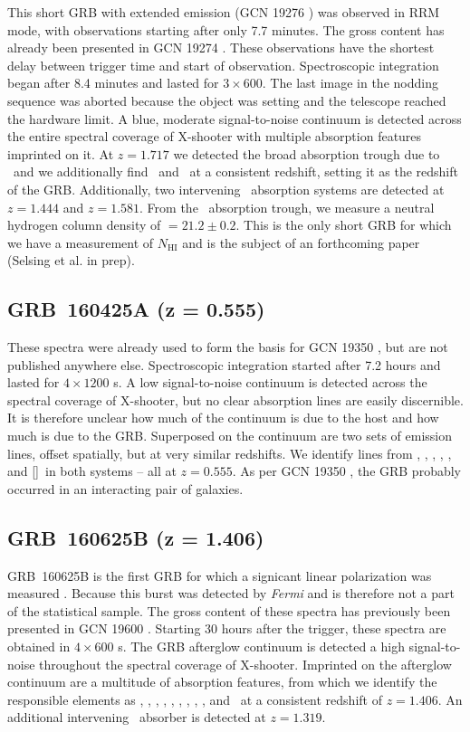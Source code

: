 \documentclass{aa}    %
\begin{document}
This short GRB with extended emission (GCN 19276 \citep{GCN19276}) was observed
in RRM mode, with observations starting after only 7.7 minutes. The gross
content has already been presented in GCN 19274 \citep{GCN19274}. These
observations have the shortest delay between trigger time and start of
observation. Spectroscopic integration began after 8.4 minutes and lasted for $3
\times 600$. The last image in the nodding sequence was aborted because the
object was setting and the telescope reached the hardware limit. A blue,
moderate signal-to-noise continuum is detected across the entire spectral
coverage of X-shooter with multiple absorption features imprinted on it. At $z =
1.717$ we detected the broad absorption trough due to \lya~and we additionally
find \alii~and \feii~at a consistent redshift, setting it as the redshift of the
GRB. Additionally, two intervening \civ~absorption systems are detected at  $z =
1.444$ and $z = 1.581$. From the \lya~absorption trough, we measure a neutral
hydrogen column density of \nh$= 21.2 \pm 0.2$. This is the only short GRB for
which we have a measurement of $N_{\mathrm{HI}}$ and is the subject of an
forthcoming paper (Selsing et al. in prep).

\subsection{GRB~160425A (z = 0.555)}\label{160425}

These spectra were already used to form the basis for GCN 19350
\citep{GCN19350}, but are not published anywhere else. Spectroscopic integration
started after 7.2 hours and lasted for $4 \times 1200$ s. A low signal-to-noise
continuum is detected across the spectral coverage of X-shooter, but no clear
absorption lines are easily discernible. It is therefore unclear how much of the
continuum is due to the host and how much is due to the GRB. Superposed on the
continuum are two sets of emission lines, offset spatially, but at very similar
redshifts. We identify lines from \oii, \hb, \oiii, \ha, \nii, and [\sii]~in both
systems -- all at $z = 0.555$. As per GCN 19350 \citep{GCN19350}, the GRB
probably occurred in an interacting pair of galaxies.

\subsection{GRB~160625B (z = 1.406)}\label{160625}

GRB~160625B is the first GRB for which a signicant linear polarization was
measured \cite{Troja2017}. Because this burst was detected by \textit{Fermi} and
is therefore not a part of the statistical sample. The gross content of these
spectra has previously been presented in GCN 19600 \citep{GCN19600}. Starting 30
hours after the trigger, these spectra are obtained in $4 \times 600$ s. The GRB
afterglow continuum is detected a high signal-to-noise throughout the spectral
coverage of X-shooter. Imprinted on the afterglow continuum are a multitude of
absorption features, from which we identify the responsible elements as \SIii,
\oi, \SIiv, \civ, \alii, \aliii, \feii, \znii, \mgii, and \mgi~at a consistent
redshift of $z = 1.406$. An additional intervening \mgii~absorber is detected at
$z = 1.319$.
\end{document}
